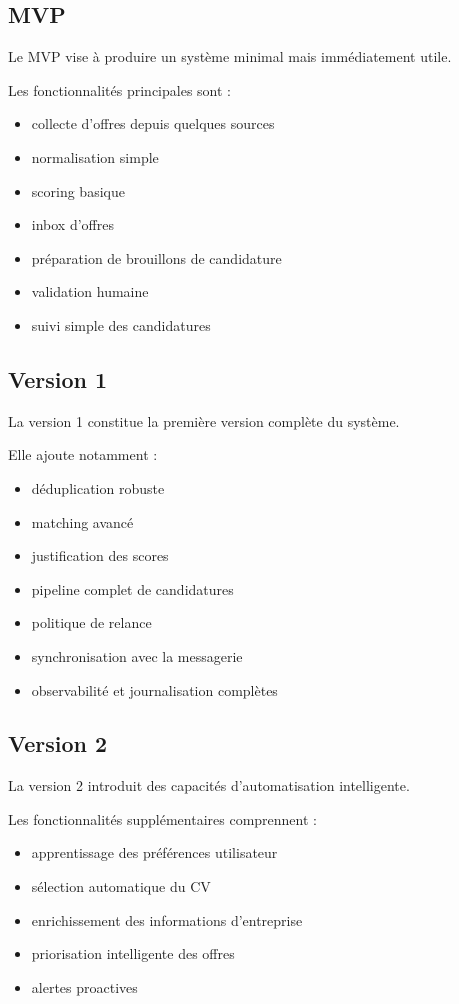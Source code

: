 \documentclass[11pt,a4paper]{article}
\begin{document}
\subsection{MVP}

Le MVP vise à produire un système minimal mais immédiatement utile.

Les fonctionnalités principales sont :

\begin{itemize}
\item collecte d’offres depuis quelques sources
\item normalisation simple
\item scoring basique
\item inbox d’offres
\item préparation de brouillons de candidature
\item validation humaine
\item suivi simple des candidatures
\end{itemize}

\subsection{Version 1}

La version 1 constitue la première version complète du système.

Elle ajoute notamment :

\begin{itemize}
\item déduplication robuste
\item matching avancé
\item justification des scores
\item pipeline complet de candidatures
\item politique de relance
\item synchronisation avec la messagerie
\item observabilité et journalisation complètes
\end{itemize}

\subsection{Version 2}

La version 2 introduit des capacités d’automatisation intelligente.

Les fonctionnalités supplémentaires comprennent :

\begin{itemize}
\item apprentissage des préférences utilisateur
\item sélection automatique du CV
\item enrichissement des informations d’entreprise
\item priorisation intelligente des offres
\item alertes proactives
\end{itemize}
\end{document}
